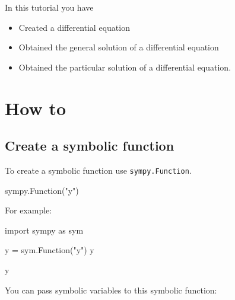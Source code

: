 \begin{note}
In this tutorial you have
\begin{itemize}
\item 

Created a differential equation

\item 

Obtained the general solution of a differential equation

\item 

Obtained the particular solution of a differential equation.

\end{itemize}
\end{note}





\section{How to}
\label{\detokenize{tools-for-mathematics/09-differential-equations/how/main:how}}\label{\detokenize{tools-for-mathematics/09-differential-equations/how/main::doc}}

\subsection{Create a symbolic function}
\label{\detokenize{tools-for-mathematics/09-differential-equations/how/main:how-to-create-a-symbolic-function}}

To create a symbolic function use \texttt{sympy.Function}.


\begin{api}
sympy.Function("y")
\end{api}



For example:




\begin{pyin}
import sympy as sym

y = sym.Function("y")
y
\end{pyin}





\begin{raw}
y
\end{raw}





You can pass symbolic variables to this symbolic function:




